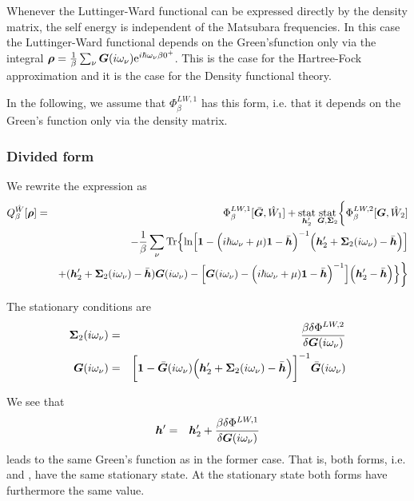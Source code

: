 \documentclass[11pt,a4paper]{report}
\begin{document}
Whenever the Luttinger-Ward functional can be expressed directly by
the density matrix, the self energy is independent of the Matsubara
frequencies. In this case the Luttinger-Ward functional depends on the
Green'sfunction only via the integral $\bm{\rho}=
\frac{1}{\beta}\sum_\nu
\bm{G}(i\omega_\nu)\mathrm{e}^{i\hbar\omega_\nu\beta0^+}$. This is the case
for the Hartree-Fock approximation and it is the case for the Density
functional theory.

In the following, we assume that $\Phi^{LW,1}_\beta$ has this form,
i.e. that it depends on the Green's function only via the density
matrix.

\subsubsection{Divided form}
We rewrite the expression as
\begin{eqnarray}
Q^{\hat{W}}_\beta[\bm{\rho}]
&=&
\Phi^{LW,1}_\beta[\bar{\bm{G}},\hat{W}_1]+
\operatorname*{stat}_{\bm{h}'_2}\operatorname*{stat}_{\bm{G},\bm{\Sigma}_2}
\biggl\lbrace
\Phi^{LW,2}_\beta[\bm{G},\hat{W}_2]
\nonumber\\
&&-\frac{1}{\beta}\sum_\nu\mathrm{Tr}\Bigl\lbrace
\ln\Bigl[
\bm{1}-
\Bigl(i\hbar\omega_\nu+\mu)\bm{1}-\bar{\bm{h}}\Bigr)^{-1}
\Bigl(\bm{h}'_2+\bm{\Sigma}_2(i\omega_\nu)-\bar{\bm{h}}\Bigr)
\Bigr]
\nonumber\\&&
+(\bm{h}'_2+\bm{\Sigma}_2(i\omega_\nu)-\bar{\bm{h}})\bm{G}(i\omega_\nu)
-
\Bigl[
\bm{G}(i\omega_\nu)
-\Bigl(i\hbar\omega_\nu+\mu)\bm{1}-\bar{\bm{h}}\Bigr)^{-1}
\Bigr]
\Bigl(\bm{h}'_2-\bar{\bm{h}}\Bigr)\Bigr\rbrace
\biggr\rbrace
\nonumber\\
\label{eq:dmfQgreenafterdivision}
\end{eqnarray}

The stationary conditions are
\begin{eqnarray}
\bm{\Sigma}_2(i\omega_\nu)
&=&\frac{\beta\delta\Phi^{LW,2}}{\delta\bm{G}(i\omega_\nu)}
\nonumber\\
\bm{G}(i\omega_\nu)&=&\biggl[\bm{1}-\bar{\bm{G}}(i\omega_\nu)
\Bigl(\bm{h}'_2
+\bm{\Sigma}_2(i\omega_\nu)-\bar{\bm{h}}\Bigr)\biggr]^{-1}
\bar{\bm{G}}(i\omega_\nu)
\end{eqnarray}

We see that 
\begin{eqnarray}
\bm{h}'&=&
\bm{h}'_2+
\frac{\beta\delta\Phi^{LW,1}}{\delta\bm{G}(i\omega_\nu)}
\end{eqnarray}
leads to the same Green's function as in the former case. That is,
both forms, i.e.  and
, have the same stationary state.  At
the stationary state both forms have furthermore the same value.
\end{document}
